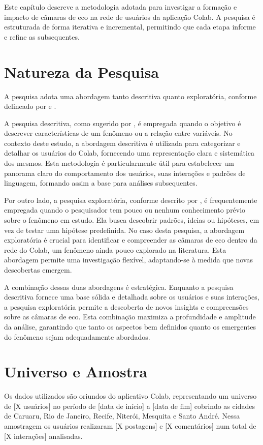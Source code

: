 Este capítulo descreve a metodologia adotada para investigar a formação e impacto de câmaras de eco na rede de usuários da aplicação Colab. A pesquisa é estruturada de forma iterativa e incremental, permitindo que cada etapa informe e refine as subsequentes.

\section{Natureza da Pesquisa}

A pesquisa adota uma abordagem tanto descritiva quanto exploratória, conforme delineado por \cite{2008_Yin_BOOK} e \cite{2007_Babbie_BOOK}.

A pesquisa descritiva, como sugerido por \cite{2007_Babbie_BOOK}, é empregada quando o objetivo é descrever características de um fenômeno ou a relação entre variáveis. No contexto deste estudo, a abordagem descritiva é utilizada para categorizar e detalhar os usuários do Colab, fornecendo uma representação clara e sistemática dos mesmos. Esta metodologia é particularmente útil para estabelecer um panorama claro do comportamento dos usuários, suas interações e padrões de linguagem, formando assim a base para análises subsequentes.

Por outro lado, a pesquisa exploratória, conforme descrito por \cite{2008_Yin_BOOK}, é frequentemente empregada quando o pesquisador tem pouco ou nenhum conhecimento prévio sobre o fenômeno em estudo. Ela busca descobrir padrões, ideias ou hipóteses, em vez de testar uma hipótese predefinida. No caso desta pesquisa, a abordagem exploratória é crucial para identificar e compreender as câmaras de eco dentro da rede do Colab, um fenômeno ainda pouco explorado na literatura. Esta abordagem permite uma investigação flexível, adaptando-se à medida que novas descobertas emergem.

A combinação dessas duas abordagens é estratégica. Enquanto a pesquisa descritiva fornece uma base sólida e detalhada sobre os usuários e suas interações, a pesquisa exploratória permite a descoberta de novos insights e compreensões sobre as câmaras de eco. Esta combinação maximiza a profundidade e amplitude da análise, garantindo que tanto os aspectos bem definidos quanto os emergentes do fenômeno sejam adequadamente abordados.

\section{Universo e Amostra}
Os dados utilizados são oriundos do aplicativo Colab, representando um universo de [X usuários] no período de [data de início] a [data de fim] cobrindo as cidades de Caruaru, Rio de Janeiro, Recife, Niterói, Mesquita e Santo André. Nessa amostragem os usuários realizaram [X postagens] e [X comentários] num total de [X interações] analisadas.


